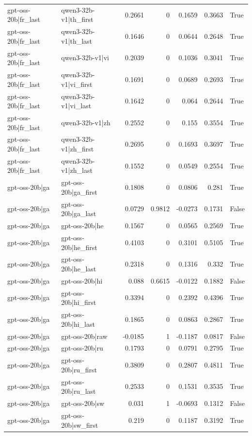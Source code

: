 \begin{table}
\begin{tabular}{l l r r r r l}
gpt-oss-20b|fr_last & qwen3-32b-v1|th_first & 0.2661 & 0 & 0.1659 & 0.3663 & True \\
gpt-oss-20b|fr_last & qwen3-32b-v1|th_last & 0.1646 & 0 & 0.0644 & 0.2648 & True \\
gpt-oss-20b|fr_last & qwen3-32b-v1|vi & 0.2039 & 0 & 0.1036 & 0.3041 & True \\
gpt-oss-20b|fr_last & qwen3-32b-v1|vi_first & 0.1691 & 0 & 0.0689 & 0.2693 & True \\
gpt-oss-20b|fr_last & qwen3-32b-v1|vi_last & 0.1642 & 0 & 0.064 & 0.2644 & True \\
gpt-oss-20b|fr_last & qwen3-32b-v1|zh & 0.2552 & 0 & 0.155 & 0.3554 & True \\
gpt-oss-20b|fr_last & qwen3-32b-v1|zh_first & 0.2695 & 0 & 0.1693 & 0.3697 & True \\
gpt-oss-20b|fr_last & qwen3-32b-v1|zh_last & 0.1552 & 0 & 0.0549 & 0.2554 & True \\
gpt-oss-20b|ga & gpt-oss-20b|ga_first & 0.1808 & 0 & 0.0806 & 0.281 & True \\
gpt-oss-20b|ga & gpt-oss-20b|ga_last & 0.0729 & 0.9812 & -0.0273 & 0.1731 & False \\
gpt-oss-20b|ga & gpt-oss-20b|he & 0.1567 & 0 & 0.0565 & 0.2569 & True \\
gpt-oss-20b|ga & gpt-oss-20b|he_first & 0.4103 & 0 & 0.3101 & 0.5105 & True \\
gpt-oss-20b|ga & gpt-oss-20b|he_last & 0.2318 & 0 & 0.1316 & 0.332 & True \\
gpt-oss-20b|ga & gpt-oss-20b|hi & 0.088 & 0.6615 & -0.0122 & 0.1882 & False \\
gpt-oss-20b|ga & gpt-oss-20b|hi_first & 0.3394 & 0 & 0.2392 & 0.4396 & True \\
gpt-oss-20b|ga & gpt-oss-20b|hi_last & 0.1865 & 0 & 0.0863 & 0.2867 & True \\
gpt-oss-20b|ga & gpt-oss-20b|raw & -0.0185 & 1 & -0.1187 & 0.0817 & False \\
gpt-oss-20b|ga & gpt-oss-20b|ru & 0.1793 & 0 & 0.0791 & 0.2795 & True \\
gpt-oss-20b|ga & gpt-oss-20b|ru_first & 0.3809 & 0 & 0.2807 & 0.4811 & True \\
gpt-oss-20b|ga & gpt-oss-20b|ru_last & 0.2533 & 0 & 0.1531 & 0.3535 & True \\
gpt-oss-20b|ga & gpt-oss-20b|sw & 0.031 & 1 & -0.0693 & 0.1312 & False \\
gpt-oss-20b|ga & gpt-oss-20b|sw_first & 0.219 & 0 & 0.1187 & 0.3192 & True \\

\end{tabular}
\end{table}
